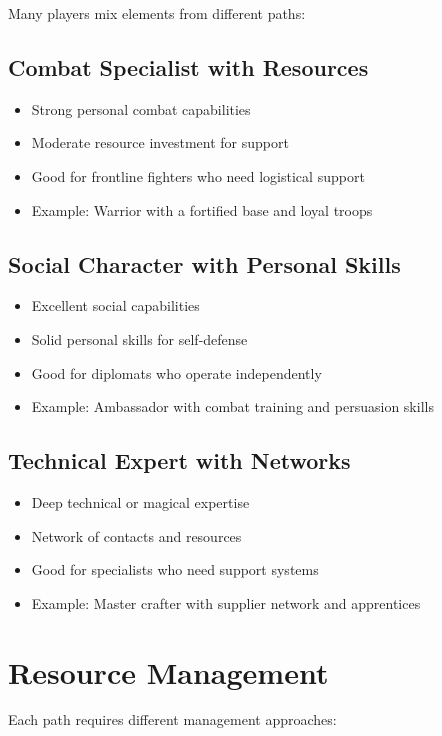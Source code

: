 Many players mix elements from different paths:

\subsection*{Combat Specialist with Resources}
\begin{itemize}
\item Strong personal combat capabilities
\item Moderate resource investment for support
\item Good for frontline fighters who need logistical support
\item Example: Warrior with a fortified base and loyal troops
\end{itemize}

\subsection*{Social Character with Personal Skills}
\begin{itemize}
\item Excellent social capabilities
\item Solid personal skills for self-defense
\item Good for diplomats who operate independently
\item Example: Ambassador with combat training and persuasion skills
\end{itemize}

\subsection*{Technical Expert with Networks}
\begin{itemize}
\item Deep technical or magical expertise
\item Network of contacts and resources
\item Good for specialists who need support systems
\item Example: Master crafter with supplier network and apprentices
\end{itemize}

\section{Resource Management}

Each path requires different management approaches:

